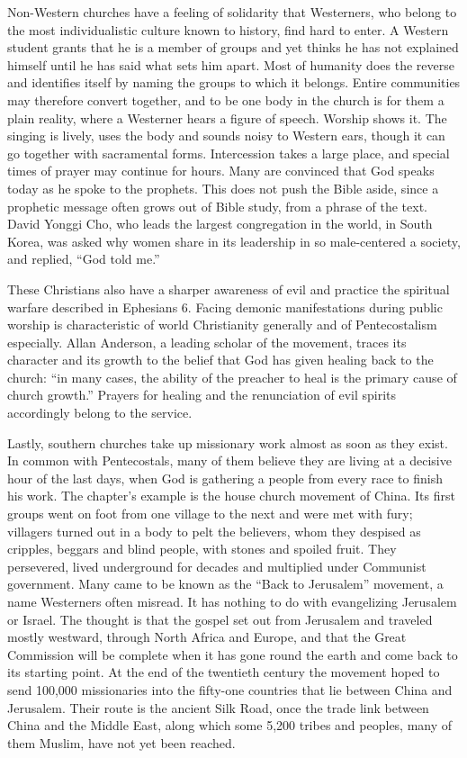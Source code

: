 Non-Western churches have a feeling of solidarity that Westerners, who belong to the most
individualistic culture known to history, find hard to enter. A Western student grants that he is a
member of groups and yet thinks he has not explained himself until he has said what sets him apart.
Most of humanity does the reverse and identifies itself by naming the groups to which it belongs.
Entire communities may therefore convert together, and to be one body in the church is for them a
plain reality, where a Westerner hears a figure of speech. Worship shows it. The singing is lively,
uses the body and sounds noisy to Western ears, though it can go together with sacramental forms.
Intercession takes a large place, and special times of prayer may continue for hours. Many are
convinced that God speaks today as he spoke to the prophets. This does not push the Bible aside,
since a prophetic message often grows out of Bible study, from a phrase of the text. David Yonggi
Cho, who leads the largest congregation in the world, in South Korea, was asked why women share in
its leadership in so male-centered a society, and replied, ``God told me.''

These Christians also have a sharper awareness of evil and practice the spiritual warfare described
in Ephesians 6. Facing demonic manifestations during public worship is characteristic of world
Christianity generally and of Pentecostalism especially. Allan Anderson, a leading scholar of the
movement, traces its character and its growth to the belief that God has given healing back to the
church: ``in many cases, the ability of the preacher to heal is the primary cause of church
growth.'' Prayers for healing and the renunciation of evil spirits accordingly belong to the service.

Lastly, southern churches take up missionary work almost as soon as they exist. In common with
Pentecostals, many of them believe they are living at a decisive hour of the last days, when God is
gathering a people from every race to finish his work. The chapter's example is the house church
movement of China. Its first groups went on foot from one village to the next and were met with fury;
villagers turned out in a body to pelt the believers, whom they despised as cripples, beggars and
blind people, with stones and spoiled fruit. They persevered, lived underground for decades and
multiplied under Communist government. Many came to be known as the ``Back to Jerusalem'' movement, a
name Westerners often misread. It has nothing to do with evangelizing Jerusalem or Israel. The
thought is that the gospel set out from Jerusalem and traveled mostly westward, through North Africa
and Europe, and that the Great Commission will be complete when it has gone round the earth and come
back to its starting point. At the end of the twentieth century the movement hoped to send 100,000
missionaries into the fifty-one countries that lie between China and Jerusalem. Their route is the
ancient Silk Road, once the trade link between China and the Middle East, along which some 5,200
tribes and peoples, many of them Muslim, have not yet been reached.

